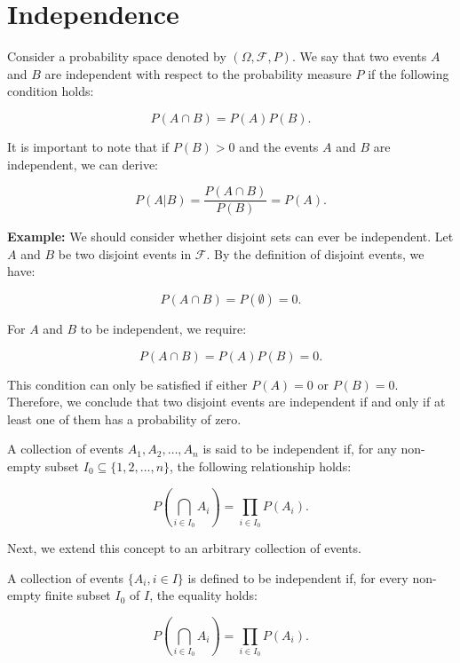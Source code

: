 \section{Independence}

\begin{definition}
    Consider a probability space denoted by \((\Omega, \mathcal{F}, P)\). We say that two events \(A\) and \(B\) are independent with respect to the probability measure \(P\) if the following condition holds:

\[
P(A \cap B) = P(A) P(B).
\]
\end{definition}

It is important to note that if \(P(B) > 0\) and the events \(A\) and \(B\) are independent, we can derive:

\[
P(A|B) = \frac{P(A \cap B)}{P(B)} = P(A).
\]

\textbf{Example:} We should consider whether disjoint sets can ever be independent. Let \(A\) and \(B\) be two disjoint events in \(\mathcal{F}\). By the definition of disjoint events, we have:

\[
P(A \cap B) = P(\emptyset) = 0.
\]

For \(A\) and \(B\) to be independent, we require:

\[
P(A \cap B) = P(A) P(B) = 0.
\]

This condition can only be satisfied if either \(P(A) = 0\) or \(P(B) = 0\). Therefore, we conclude that two disjoint events are independent if and only if at least one of them has a probability of zero.

\begin{definition}
    A collection of events \(A_1, A_2, \ldots, A_n\) is said to be independent if, for any non-empty subset \(I_0 \subseteq \{1, 2, \ldots, n\}\), the following relationship holds:

\[
P\left(\bigcap_{i \in I_0} A_i\right) = \prod_{i \in I_0} P(A_i).
\]
\end{definition}

Next, we extend this concept to an arbitrary collection of events.

\begin{definition}
    A collection of events \(\{A_i, i \in I\}\) is defined to be independent if, for every non-empty finite subset \(I_0\) of \(I\), the equality holds:

\[
P\left(\bigcap_{i \in I_0} A_i\right) = \prod_{i \in I_0} P(A_i).
\]
\end{definition}

